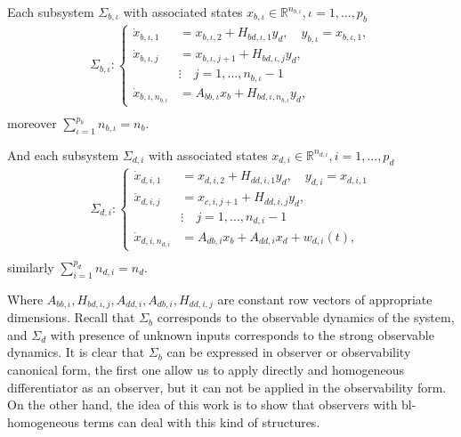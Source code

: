 \documentclass[11pt,letterpaper,twoside,openright]{report}
\newcommand{\RE}{\mathbb{R}}
\begin{document}
Each subsystem $\Sigma_{b,\iota}$ with associated states $x_{b,\iota}\in \RE^{n_{b,\iota}}, \iota=1,...,p_b$ 
\begin{equation}
	\begin{split}\label{ecu: CH4 Sigma_b}
		\Sigma_{b,\iota}: \left\{
		\begin{array}{rl}
		\dot{x}_{b,\iota,1} &= x_{b,\iota,2} + H_{bd,\iota,1}y_d, \quad y_{b,\iota}=x_{b,\iota,1}, \\
		\dot{x}_{b,\iota,j} &= x_{b,\iota,j+1} + H_{bd,\iota,j}y_d, \\
		& \vdots \quad j=1,...,n_{b,\iota}-1\\
		\dot{x}_{b,\iota,n_{b,\iota}} &= A_{bb,\iota}x_{b} + H_{bd,\iota,n_{b,\iota}}y_d, 
	\end{array}
\right. \\
	\end{split}
\end{equation}
moreover $\sum_{\iota=1}^{p_b}n_{b,\iota}=n_b$.

And each subsystem $\Sigma_{d,i}$ with associated states $x_{d,i} \in \RE^{n_{d,i}}, i=1,...,p_d$ 
\begin{equation}
	\begin{split}\label{ecu: CH4 Sigma_d}
		\Sigma_{d,i}: \left\{
		\begin{array}{rl}
		\dot{x}_{d,i,1} &= x_{d,i,2} + H_{dd,i,1}y_d,  \quad y_{d,i} = x_{d,i,1} \\
		\dot{x}_{d,i,j} &= x_{c,i,j+1} + H_{dd,i,j}y_d, \\
		& \vdots \quad j=1,...,n_{d,i}-1\\
		\dot{x}_{d,i,n_{d,i}} &= A_{db,i}x_b + A_{dd,i}x_d + w_{d,i}(t),
	\end{array}
\right. \\ 
	\end{split}
\end{equation}
similarly $\sum_{i=1}^{p_d}n_{d,i}=n_d$.

Where $A_{bb,\iota},H_{bd,\iota,j},A_{dd,i},A_{db,i},H_{dd,i,j}$ are constant row vectors of appropriate dimensions. Recall that $\Sigma_b$ corresponds to the observable dynamics of the system, and $\Sigma_d$ with presence of unknown inputs corresponds to the strong observable dynamics. It is clear that $\Sigma_b$ can be expressed in observer or observability  canonical form, the first one allow us to apply directly and homogeneous differentiator as an observer\cite{Niederwieser2021}, but it can not be applied in the observability form. On the other hand, the idea of this work is to show that observers with bl-homogeneous terms can deal with this kind of structures.
\end{document}
